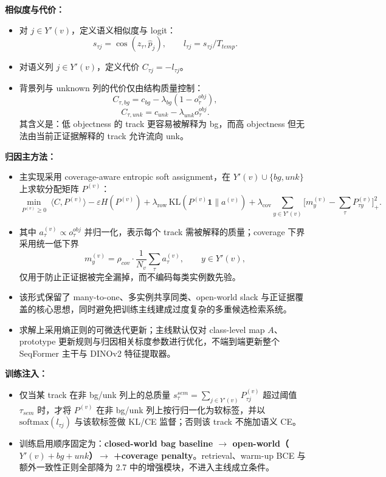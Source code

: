 \documentclass[UTF8]{ctexart}
\begin{document}
\textbf{相似度与代价：}
\begin{itemize}
\item 对 $j\in Y'(v)$，定义语义相似度与 logit：
\[
 s_{\tau j}=\cos(z_\tau,\hat p_j),\qquad l_{\tau j}=s_{\tau j}/T_{temp}.
\]
\item 对语义列 $j\in Y'(v)$，定义代价 $C_{\tau j}=-l_{\tau j}$。
\item 背景列与 unknown 列的代价仅由结构质量控制：
\[
 C_{\tau,bg}=c_{bg}-\lambda_{bg}(1-o_\tau^{obj}),
\]
\[
 C_{\tau,unk}=c_{unk}-\lambda_{unk}o_\tau^{obj}.
\]
其含义是：低 objectness 的 track 更容易被解释为 bg，而高 objectness 但无法由当前正证据解释的 track 允许流向 unk。
\end{itemize}

\textbf{归因主方法：}
\begin{itemize}
\item 主实现采用 coverage-aware entropic soft assignment，在 $Y'(v)\cup\{bg,unk\}$ 上求软分配矩阵 $P^{(v)}$：
\[
 \min_{P^{(v)}\ge 0}\ \langle C,P^{(v)}\rangle - \varepsilon H(P^{(v)})
 + \lambda_{\mathrm{row}}\,\mathrm{KL}(P^{(v)}\mathbf 1\|a^{(v)})
 + \lambda_{\mathrm{cov}}\sum_{y\in Y'(v)} \Big[m_y^{(v)}-\sum_\tau P^{(v)}_{\tau y}\Big]_+^2.
\]
\item 其中 $a_\tau^{(v)}\propto o_\tau^{obj}$ 并归一化，表示每个 track 需被解释的质量；coverage 下界采用统一低下界
\[
 m_y^{(v)}=\rho_{cov}\cdot \frac{1}{N_v}\sum_\tau a_\tau^{(v)},\qquad y\in Y'(v),
\]
仅用于防止正证据被完全漏掉，而不编码每类实例数先验。
\item 该形式保留了 many-to-one、多实例共享同类、open-world slack 与正证据覆盖的核心思想，同时避免把训练主线建成过度复杂的多重候选检索系统。
\item 求解上采用熵正则的可微迭代更新；主线默认仅对 class-level map $A$、prototype 更新规则与归因相关标度参数进行优化，不端到端更新整个 SeqFormer 主干与 DINOv2 特征提取器。
\end{itemize}

\textbf{训练注入：}
\begin{itemize}
\item 仅当某 track 在非 bg/unk 列上的总质量 $s_\tau^{sem}=\sum_{j\in Y'(v)}P_{\tau j}^{(v)}$ 超过阈值 $\tau_{sem}$ 时，才将 $P^{(v)}$ 在非 bg/unk 列上按行归一化为软标签，并以 $\mathrm{softmax}(l_{\tau j})$ 与该软标签做 KL/CE 监督；否则该 track 不施加语义 CE。
\item 训练启用顺序固定为：\textbf{closed-world bag baseline $\rightarrow$ open-world（$Y'(v)+bg+unk$）$\rightarrow$ +coverage penalty}。retrieval、warm-up BCE 与额外一致性正则全部降为 2.7 中的增强模块，不进入主线成立条件。
\end{itemize}
\end{document}
